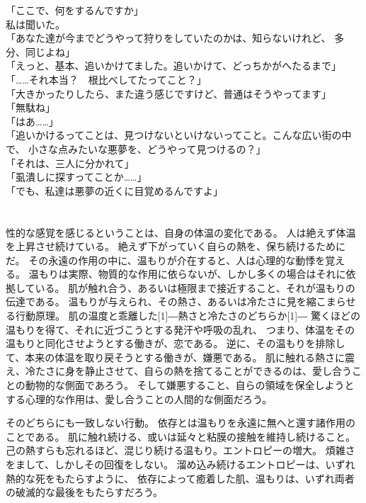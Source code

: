 \documentclass[../IHMain]{subfiles}
\begin{document}
「ここで、何をするんですか」\\
私は聞いた。\\
「あなた達が今までどうやって狩りをしていたのかは、知らないけれど、
多分、同じよね」\\
「えっと、基本、追いかけてました。追いかけて、どっちかがへたるまで」\\
「……それ本当？　根比べしてたってこと？」\\
「大きかったりしたら、また違う感じですけど、普通はそうやってます」\\
「無駄ね」\\
「はあ……」\\
「追いかけるってことは、見つけないといけないってこと。こんな広い街の中で、
小さな点みたいな悪夢を、どうやって見つけるの？」\\
「それは、三人に分かれて」\\
「虱潰しに探すってことか……」\\
「でも、私達は悪夢の近くに目覚めるんですよ」\\


\section{}
性的な感覚を感じるということは、自身の体温の変化である。
人は絶えず体温を上昇させ続けている。
絶えず下がっていく自らの熱を、保ち続けるためにだ。
その永遠の作用の中に、温もりが介在すると、人は心理的な動悸を覚える。
温もりは実際、物質的な作用に依らないが、しかし多くの場合はそれに依拠している。
肌が触れ合う、あるいは極限まで接近すること、それが温もりの伝達である。
温もりが与えられ、その熱さ、あるいは冷たさに見を縮こまらせる行動原理。
肌の温度と乖離した\scalebox{3}[1]{―}熱さと冷たさのどちらか\scalebox{3}[1]{―}
驚くほどの温もりを得て、それに近づこうとする発汗や呼吸の乱れ、
つまり、体温をその温もりと同化させようとする働きが、恋である。
逆に、その温もりを排除して、本来の体温を取り戻そうとする働きが、嫌悪である。
肌に触れる熱さに震え、冷たさに身を静止させて、自らの熱を捨てることができるのは、愛し合うことの動物的な側面であろう。
そして嫌悪すること、自らの領域を保全しようとする心理的な作用は、愛し合うことの人間的な側面だろう。

そのどちらにも一致しない行動。
依存とは温もりを永遠に無へと還す諸作用のことである。
肌に触れ続ける、或いは延々と粘膜の接触を維持し続けること。
己の熱すらも忘れるほど、混じり続ける温もり。エントロピーの増大。
煩雑さをまして、しかしその回復をしない。
溜め込み続けるエントロピーは、いずれ熱的な死をもたらすように、
依存によって癒着した肌、温もりは、いずれ両者の破滅的な最後をもたらすだろう。
\end{document}
